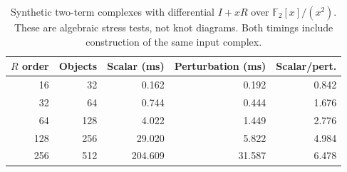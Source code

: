 \begin{table}[htbp]
\centering\small
\setlength{\tabcolsep}{4pt}
\begin{tabular}{rrrrr}
\toprule
$R$ order & Objects & Scalar (ms) & Perturbation (ms) & Scalar/pert. \\
\midrule
16 & 32 & 0.162 & 0.192 & 0.842 \\
32 & 64 & 0.744 & 0.444 & 1.676 \\
64 & 128 & 4.022 & 1.449 & 2.776 \\
128 & 256 & 29.020 & 5.822 & 4.984 \\
256 & 512 & 204.609 & 31.587 & 6.478 \\
\bottomrule
\end{tabular}
\caption{Synthetic two-term complexes with differential $I+xR$ over $\mathbb F_2[x]/(x^2)$. These are algebraic stress tests, not knot diagrams. Both timings include construction of the same input complex.}
\label{tab:hpl-synthetic}
\end{table}
